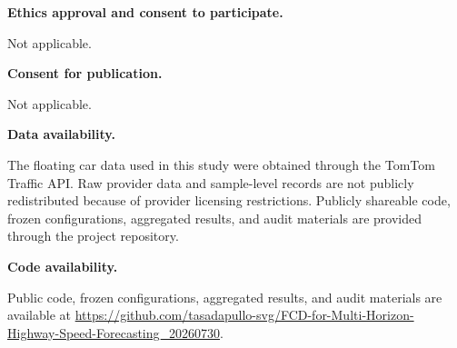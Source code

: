 \documentclass[pdflatex,sn-basic,Numbered]{sn-jnl}
\begin{document}
\textbf{Ethics approval and consent to participate.}

Not applicable.

\textbf{Consent for publication.}

Not applicable.

\textbf{Data availability.}

The floating car data used in this study were obtained through the TomTom Traffic API. Raw provider data and sample-level records are not publicly redistributed because of provider licensing restrictions. Publicly shareable code, frozen configurations, aggregated results, and audit materials are provided through the project repository.

\textbf{Code availability.}

Public code, frozen configurations, aggregated results, and audit materials are available at
\url{https://github.com/tasadapullo-svg/FCD-for-Multi-Horizon-Highway-Speed-Forecasting_20260730}.



\end{document}
